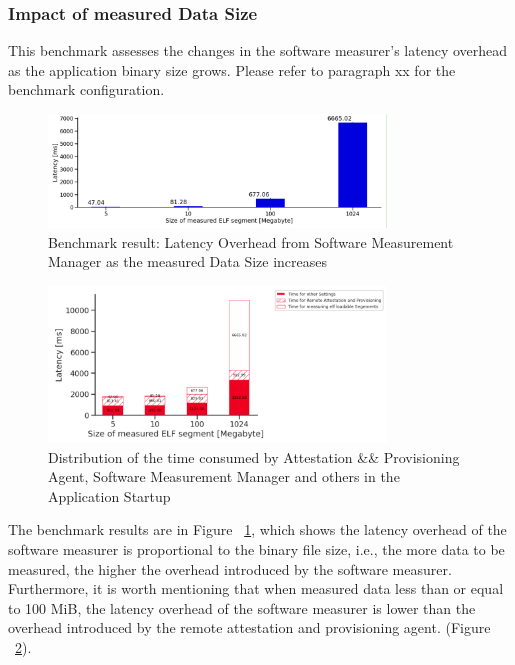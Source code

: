 \subsubsection{Impact of measured Data Size}
This benchmark assesses the changes in the software measurer's latency overhead as the application binary size grows. Please refer to paragraph xx for the benchmark configuration.

\begin{figure}[H]
    \centering
    \includegraphics[width=0.8\textwidth]{images/overhead_software_measurement_manager_as_elf_size_increasing.PNG}
    \caption[Benchmark result: Latency Overhead from Software Measurement Manager as the measured Data Size increases]{Benchmark result: Latency Overhead from Software Measurement Manager as the measured Data Size increases}
    \label{fig:overhead_software_measurement_manager_as_elf_size_increasing}
\end{figure}

\begin{figure}[H]
    \centering
    \includegraphics[width=0.8\textwidth]{images/startup_time_change_as_elf_size_increasing.PNG}
    \caption[Distribution of the time consumed by Attestation \&\& Provisioning Agent, Software Measurement Manager and others in the Application Startup]{Distribution of the time consumed by Attestation \&\& Provisioning Agent, Software Measurement Manager and others in the Application Startup}
    \label{fig:startup_time_change_as_elf_size_increasing}
\end{figure}



The benchmark results are in Figure ~\ref{fig:overhead_software_measurement_manager_as_elf_size_increasing}, which shows the latency overhead of the software measurer is proportional to the binary file size, i.e., the more data to be measured, the higher the overhead introduced by the software measurer. Furthermore, it is worth mentioning that when measured 
data less than or equal to 100 MiB, the latency overhead of the software measurer is lower than the overhead introduced by the remote attestation and provisioning agent. (Figure ~\ref{fig:startup_time_change_as_elf_size_increasing}).



